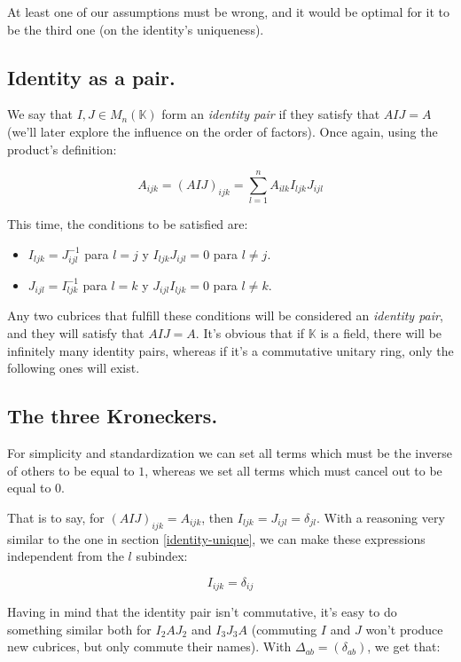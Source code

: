 At least one of our assumptions must be wrong, and it would be optimal for it to be the third one (on the identity's uniqueness).

\subsection{Identity as a pair.} \label{identity-pair}

We say that $I, J \in M_{n} (\mathbb{K})$ form an \textit{identity pair} if they satisfy that $AIJ = A$ (we'll later explore the influence on the order of factors). Once again, using the product's definition:

$$A_{ijk} = (AIJ)_{ijk} = \sum\limits_{l=1}^{n} A_{ilk} I_{ljk} J_{ijl}$$

This time, the conditions to be satisfied are:

\begin{itemize}
	\item $I_{ljk} = J_{ijl}^{-1}$ para $l = j$ y $I_{ljk} J_{ijl} = 0$ para $l \neq j$.
	\item $J_{ijl} = I_{ljk}^{-1}$ para $l = k$ y $J_{ijl} I_{ljk} = 0$ para $l \neq k$.
\end{itemize}

Any two cubrices that fulfill these conditions will be considered an \textit{identity pair}, and they will satisfy that $AIJ = A$. It's obvious that if $\mathbb{K}$ is a field, there will be infinitely many identity pairs, whereas if it's a commutative unitary ring, only the following ones will exist.

\subsection{The three Kroneckers.} \label{identity-kronecker}

For simplicity and standardization we can set all terms which must be the inverse of others to be equal to $1$, whereas we set all terms which must cancel out to be equal to $0$.

That is to say, for $(AIJ)_{ijk} = A_{ijk}$, then $I_{ljk} = J_{ijl} = \delta_{jl}$. With a reasoning very similar to the one in section \ref{identity-unique}, we can make these expressions independent from the $l$ subindex:

$$I_{ijk} = \delta_{ij}$$

Having in mind that the identity pair isn't commutative, it's easy to do something similar both for $I_2 A J_2$ and $I_3 J_3 A$ (commuting $I$ and $J$ won't produce new cubrices, but only commute their names). With $\Delta_{ab} = (\delta_{ab})$, we get that:

